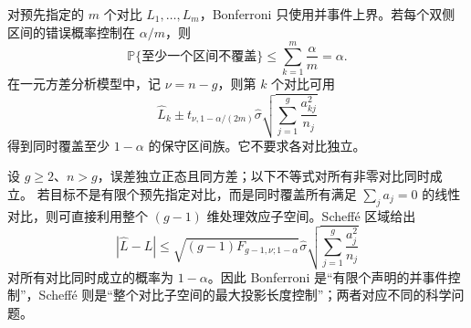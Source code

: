 \begin{proposition}
对预先指定的 $m$ 个对比 $L_1,\ldots,L_m$，Bonferroni 只使用并事件上界。若每个双侧区间的错误概率控制在 $\alpha/m$，则
\[
 \mathbb P\{\text{至少一个区间不覆盖}\}
 \le\sum_{k=1}^m\frac{\alpha}{m}
 =\alpha.
\]
在一元方差分析模型中，记 $\nu=n-g$，则第 $k$ 个对比可用
\[
 \widehat L_k
 \pm
 t_{\nu,1-\alpha/(2m)}
 \widehat\sigma\sqrt{\sum_{j=1}^g\frac{a_{kj}^2}{n_j}}
\]
得到同时覆盖至少 $1-\alpha$ 的保守区间族。它不要求各对比独立。
\end{proposition}

\begin{theorem}
设 $g\ge2$、$n>g$，误差独立正态且同方差；以下不等式对所有非零对比同时成立。
若目标不是有限个预先指定对比，而是同时覆盖所有满足 $\sum_ja_j=0$ 的线性对比，则可直接利用整个 $(g-1)$ 维处理效应子空间。Scheffé 区域给出
\begin{equation}\label{eq:math-stat-scheffe-simultaneous}
 |\widehat L-L|
 \le
 \sqrt{(g-1)F_{g-1,\nu;1-\alpha}}
 \widehat\sigma\sqrt{\sum_{j=1}^g\frac{a_j^2}{n_j}}
\end{equation}
对所有对比同时成立的概率为 $1-\alpha$。因此 Bonferroni 是“有限个声明的并事件控制”，Scheffé 则是“整个对比子空间的最大投影长度控制”；两者对应不同的科学问题。
\end{theorem}

